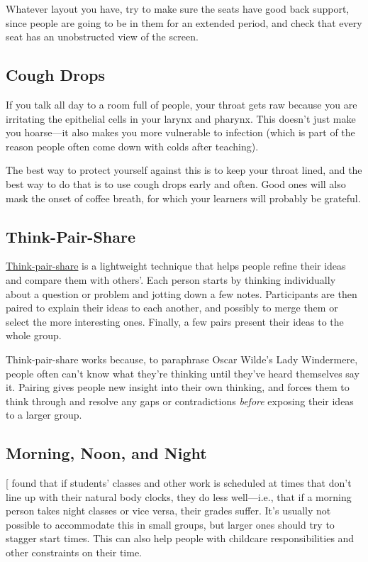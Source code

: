 Whatever layout you have, try to make sure the seats have good back
support, since people are going to be in them for an extended period,
and check that every seat has an unobstructed view of the screen.

\subsection{Cough Drops}\label{cough-drops}

If you talk all day to a room full of people, your throat gets raw
because you are irritating the epithelial cells in your larynx and
pharynx. This doesn't just make you hoarse---it also makes you more
vulnerable to infection (which is part of the reason people often come
down with colds after teaching).

The best way to protect yourself against this is to keep your throat
lined, and the best way to do that is to use cough drops early and
often. Good ones will also mask the onset of coffee breath, for which
your learners will probably be grateful.

\subsection{Think-Pair-Share}\label{think-pair-share}

\protect\hyperlink{g:think-pair-share}{Think-pair-share} is a lightweight technique
that helps people refine their ideas and compare them with
others'. Each person starts by thinking individually about a question
or problem and jotting down a few notes. Participants are then paired
to explain their ideas to each another, and possibly to merge them or
select the more interesting ones. Finally, a few pairs present their
ideas to the whole group.

Think-pair-share works because, to paraphrase Oscar Wilde's Lady
Windermere, people often can't know what they're thinking until they've
heard themselves say it. Pairing gives people new insight into their own
thinking, and forces them to think through and resolve any gaps or
contradictions \emph{before} exposing their ideas to a larger group.

\subsection{Morning, Noon, and Night}\label{morning-noon-and-night}

{[}\protect[\hyperlink{b:Smar2018}{Smar2018}]{]} found that if students' classes and other work is
scheduled at times that don't line up with their natural body clocks,
they do less well---i.e., that if a morning person takes night classes or
vice versa, their grades suffer. It's usually not possible to
accommodate this in small groups, but larger ones should try to stagger
start times. This can also help people with childcare responsibilities
and other constraints on their time.

